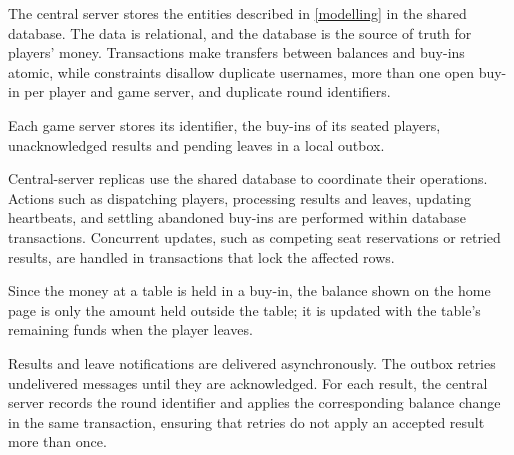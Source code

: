 \documentclass{scrartcl}
\begin{document}


The central server stores the entities described in \cref{modelling} in the shared database. The data is relational, and the database is the source of truth
for players’ money. Transactions make transfers between balances and buy-ins atomic, while constraints disallow duplicate 
usernames, more than one open buy-in per player and game server, and duplicate round identifiers.

Each game server stores its identifier, the buy-ins of its seated players, unacknowledged results and pending leaves 
in a local outbox.

Central-server replicas use the shared database to coordinate their operations. Actions such as 
dispatching players, processing results and leaves, updating heartbeats, and settling abandoned buy-ins are performed within database transactions. 
Concurrent updates, such as competing seat reservations or retried results, are handled in transactions that
lock the affected rows.

Since the money at a table is held in a buy-in, the balance shown on the home page is only the amount held outside the table; it is updated with the table’s remaining funds
when the player leaves.

Results and leave notifications are delivered asynchronously. The outbox retries undelivered messages until they are acknowledged. 
For each result, the central server records the round identifier and applies the corresponding balance change in 
the same transaction, ensuring that retries do not apply an accepted result more than once.

\end{document}
